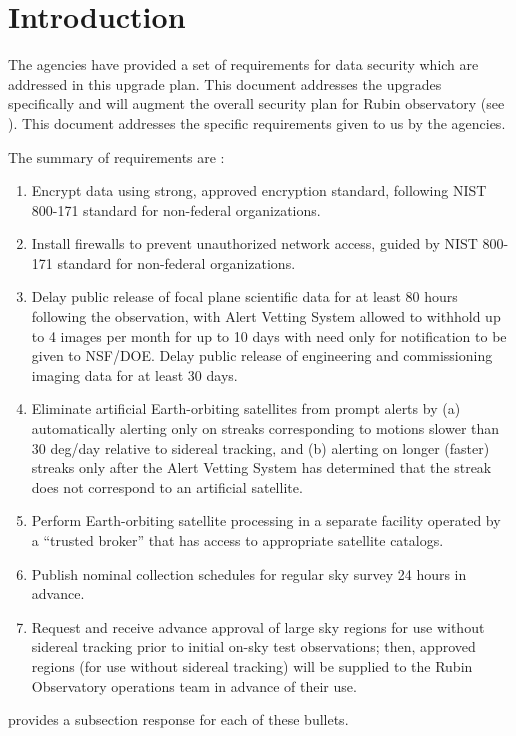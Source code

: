 \section{Introduction}

The agencies have provided a set of requirements for data security which are addressed in this upgrade plan.  This document addresses the upgrades specifically and will augment the overall security plan for Rubin observatory (see ).
This document addresses the specific requirements given to us by the agencies.

The summary of requirements are :
\begin{enumerate}

\item	Encrypt data using strong, approved encryption standard, following NIST 800-171 standard for  non-federal organizations.
\item	Install firewalls to prevent unauthorized network access, guided by NIST 800-171 standard for  non-federal organizations.
\item	Delay public release of focal plane scientific data for at least 80 hours following the observation, with Alert Vetting System allowed to withhold up to 4 images per month for up to 10 days with need only for notification to be given to NSF/DOE. Delay public release of engineering and commissioning imaging data for at least 30 days.
\item	Eliminate artificial Earth-orbiting satellites from prompt alerts by (a) automatically alerting only on streaks corresponding to motions slower than 30 deg/day relative to sidereal tracking, and (b) alerting on longer (faster) streaks only after the Alert Vetting System has determined that the streak does not correspond to an artificial satellite.
\item	Perform Earth-orbiting satellite processing in a separate facility operated by a “trusted broker” that has access to appropriate satellite catalogs.
\item	Publish nominal collection schedules for regular sky survey 24 hours in advance.
\item	Request and receive advance approval of large sky regions for use without sidereal tracking prior to initial on-sky test observations; then, approved regions (for use without sidereal tracking) will be supplied to the Rubin Observatory operations team in advance of their use.

\end{enumerate}


 provides a subsection response for each of these bullets.

